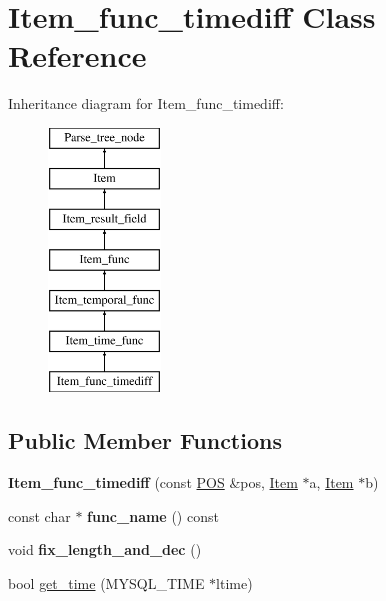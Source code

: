 \hypertarget{classItem__func__timediff}{}\section{Item\+\_\+func\+\_\+timediff Class Reference}
\label{classItem__func__timediff}
Inheritance diagram for Item\+\_\+func\+\_\+timediff\+:\begin{figure}[H]
\begin{center}
\leavevmode
\includegraphics[height=7.000000cm]{classItem__func__timediff}
\end{center}
\end{figure}
\subsection*{Public Member Functions}
\begin{DoxyCompactItemize}
\item 
\mbox{\label{classItem__func__timediff_a38d061b9b731488f0e744e767fea4504}} 
{\bfseries Item\+\_\+func\+\_\+timediff} (const \mbox{\hyperlink{structYYLTYPE}{P\+OS}} \&pos, \mbox{\hyperlink{classItem}{Item}} $\ast$a, \mbox{\hyperlink{classItem}{Item}} $\ast$b)
\item 
\mbox{\label{classItem__func__timediff_a399d6567e5341584f5fcbe9e99869787}} 
const char $\ast$ {\bfseries func\+\_\+name} () const
\item 
\mbox{\label{classItem__func__timediff_ae4e99ebdb7b6242eda65eb52d1f88cb0}} 
void {\bfseries fix\+\_\+length\+\_\+and\+\_\+dec} ()
\item 
bool \mbox{\hyperlink{classItem__func__timediff_ae7d560e09a137200abe870ccc34789ef}{get\+\_\+time}} (M\+Y\+S\+Q\+L\+\_\+\+T\+I\+ME $\ast$ltime)
\end{DoxyCompactItemize}
